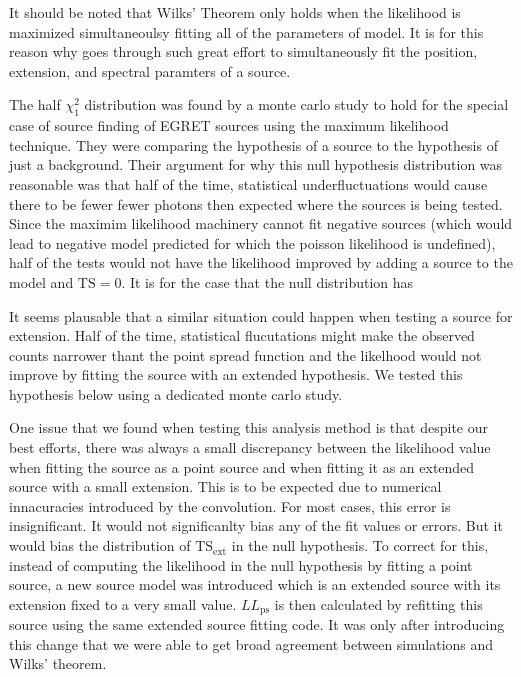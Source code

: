 \documentclass[preprint]{aastex}
\newcommand{\tsext}{{\ensuremath{\text{TS}_\text{ext}}}\xspace}
\newcommand{\ts}{\text{TS}\xspace}
\newcommand{\pointlike}{\text{\em pointlike}\xspace}
\begin{document}
It should be noted that Wilks' Theorem only holds when the likelihood
is maximized simultaneoulsy fitting all of the parameters of model. It
is for this reason why \pointlike goes through such great effort to
simultaneously fit the position, extension, and spectral paramters of
a source.

The half $\chi^2_1$ distribution was found by a monte carlo study
to hold for the special case of source finding of EGRET sources using the
maximum likelihood technique.  They were comparing the hypothesis of a
source to the hypothesis of just a background\cite{Mattox_et_All_Paper}.
Their argument for why this null hypothesis distribution was reasonable
was that half of the time, statistical underfluctuations would cause
there to be fewer fewer photons then expected where the sources is being
tested. Since the maximim likelihood machinery cannot fit negative
sources (which would lead to negative model predicted for which the
poisson likelihood is undefined), half of the tests would not have the
likelihood improved by adding a source to the model and $\ts=0$.
It is for the case that the null distribution has 

It seems plausable that a similar situation could happen when testing
a source for extension. Half of the time, statistical flucutations might
make the observed counts narrower thant the point spread function and
the likelhood would not improve by fitting the source with an extended
hypothesis. We tested this hypothesis below using a dedicated monte
carlo study.

One issue that we found when testing this analysis method is that
despite our best efforts, there was always a small discrepancy between
the likelihood value when fitting the source as a point source and when
fitting it as an extended source with a small extension.  This is to be
expected due to numerical innacuracies introduced by the convolution.
For most cases, this error is insignificant. It would not significanlty
bias any of the fit values or errors. But it would bias the distribution
of $\tsext$ in the null hypothesis. To correct for this,
instead of computing the likelihood in the null hypothesis by fitting
a point source, a new source model was introduced which is an extended
source with its extension fixed to a very small value. $LL_\text{ps}$
is then calculated by refitting this source using the same extended
source fitting code. It was only after introducing this change that we
were able to get broad agreement between simulations and Wilks' theorem.
\end{document}
